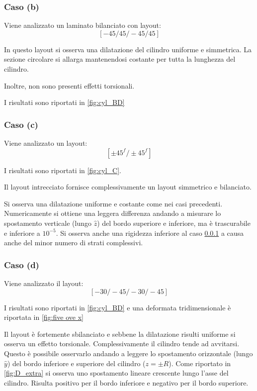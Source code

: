 \documentclass[a4paper,num-refs]{oup-contemporary}
\begin{document}
\subsubsection{Caso (b)}
\label{sec:cyl_B}

Viene analizzato un laminato bilanciato con layout:
\begin{equation}
	\left[-45 / 45 /-45 / 45\right]
\end{equation}

In questo layout si osserva una dilatazione del cilindro uniforme e simmetrica. La sezione circolare si allarga mantenendosi costante per tutta la lunghezza del cilindro. 

Inoltre, non sono presenti effetti torsionali. 

I risultati sono riportati in \cref{fig:cyl_BD}

\subsubsection{Caso (c)}
\label{sec:cyl_C}
Viene analizzato un layout:
\begin{equation}
	\left[\pm 45^{f} / \pm 45^{f}\right]
\end{equation}

I risultati sono riportati in \cref{fig:cyl_C}.

Il layout intrecciato fornisce complessivamente un layout simmetrico e bilanciato. 

Si osserva una dilatazione uniforme e costante come nei casi precedenti. Numericamente si ottiene una leggera differenza andando a misurare lo spostamento verticale (lungo $\hat z$) del bordo superiore e inferiore, ma è trascurabile e inferiore a $10^{-5}$. Si osserva anche una rigidezza inferiore al caso \cref{sec:cyl_B} a causa anche del minor numero di strati complessivi. 

\subsubsection{Caso (d)}
\label{sec:cyl_D}

Viene analizzato il layout:
\begin{equation}
	\left[-30 /-45 /-30 /-45\right]
\end{equation}

I risultati sono riportati in \cref{fig:cyl_BD} e una deformata tridimensionale è riportata in \cref{fig:five ove x}

Il layout è fortemente sbilanciato e sebbene la dilatazione risulti uniforme si osserva un effetto torsionale. Complessivamente il cilindro tende ad avvitarsi. Questo è possibile osservarlo andando a leggere lo spostamento orizzontale (lungo $\hat y$) del bordo inferiore e superiore del cilindro ($z=\pm R$). Come riportato in \cref{fig:D_extra} si osserva uno spostamento lineare crescente lungo l'asse del cilindro. Risulta positivo per il bordo inferiore e negativo per il bordo superiore.
\end{document}
